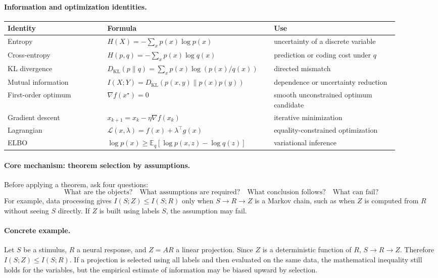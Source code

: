 \paragraph{Information and optimization identities.}
\begin{center}
\small
\setlength{\tabcolsep}{2pt}
\renewcommand{\arraystretch}{1.12}
\begin{tabular}{p{0.24\linewidth}p{0.36\linewidth}p{0.30\linewidth}}
\toprule
Identity & Formula & Use \\
\midrule
Entropy & \(H(X)=-\sum_x p(x)\log p(x)\) & uncertainty of a discrete variable \\
Cross-entropy & \(H(p,q)=-\sum_x p(x)\log q(x)\) & prediction or coding cost under \(q\) \\
KL divergence & \(D_{\mathrm{KL}}(p\|q)=\sum_xp(x)\log(p(x)/q(x))\) & directed mismatch \\
Mutual information & \(I(X;Y)=D_{\mathrm{KL}}(p(x,y)\|p(x)p(y))\) & dependence or uncertainty reduction \\
First-order optimum & \(\nabla f(x^\star)=0\) & smooth unconstrained optimum candidate \\
Gradient descent & \(x_{k+1}=x_k-\eta\nabla f(x_k)\) & iterative minimization \\
Lagrangian & \(\mathcal L(x,\lambda)=f(x)+\lambda^\top g(x)\) & equality-constrained optimization \\
ELBO & \(\log p(x)\geq \mathbb E_q[\log p(x,z)-\log q(z)]\) & variational inference \\
\bottomrule
\end{tabular}
\end{center}

\paragraph{Core mechanism: theorem selection by assumptions.}
Before applying a theorem, ask four questions:
\[
\text{What are the objects?}\quad
\text{What assumptions are required?}\quad
\text{What conclusion follows?}\quad
\text{What can fail?}
\]
For example, data processing gives \(I(S;Z)\leq I(S;R)\) only when \(S\to R\to Z\) is a Markov chain, such as when \(Z\) is computed from \(R\) without seeing \(S\) directly. If \(Z\) is built using labels \(S\), the assumption may fail.

\paragraph{Concrete example.}
Let \(S\) be a stimulus, \(R\) a neural response, and \(Z=AR\) a linear projection. Since \(Z\) is a deterministic function of \(R\), \(S\to R\to Z\). Therefore \(I(S;Z)\leq I(S;R)\). If a projection is selected using all labels and then evaluated on the same data, the mathematical inequality still holds for the variables, but the empirical estimate of information may be biased upward by selection.


